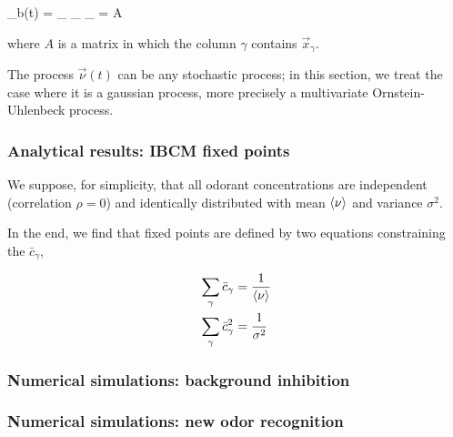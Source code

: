 \beq
	_b(t) = \sum_{\gamma} \nu_{\gamma} _{\gamma} = A \vec{\nu}
	\label{eq:general_linear_background}
\eeq

where $A$ is a matrix in which the column $\gamma$ contains $\vec{x}_{\gamma}$. 

The process $\vec{\nu}(t)$ can be any stochastic process; in this section, we treat the case where it is a gaussian process, more precisely a multivariate Ornstein-Uhlenbeck process. 


\subsubsection{Analytical results: IBCM fixed points}
\label{subsubsect:fixed_points_gauss}

We suppose, for simplicity, that all odorant concentrations are independent (correlation $\rho = 0$) and identically distributed with mean $\braket{\nu}$ and variance $\sigma^2$.


In the end, we find that fixed points are defined by two equations constraining the $\bar{c}_{\gamma}$, 

\begin{align}
	\sum_{\gamma} \bar{c}_\gamma &=   \frac{1}{\braket{\nu}}		\label{eq:sum_cgammas}	\\
	\sum_{\gamma} \bar{c}_{\gamma}^2 &= \frac{1}{\sigma^2}		\label{eq:sum_cgammas2}
\end{align}


\subsubsection{Numerical simulations: background inhibition}
\label{subsubsect:simul_gauss_inhib}


\subsubsection{Numerical simulations: new odor recognition}
\label{subsubsect:simul_gauss_new}

